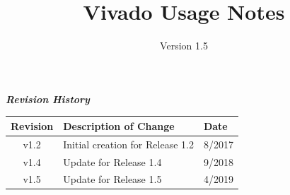 \def\docTitle{Vivado Usage Notes}
\def\docVersion{1.5}
\def\snippetpath{snippets}


\date{Version \docVersion} %
\title{\docTitle}
\lhead{\small{\docTitle}}
\usepackage{enumitem}

\maketitle
\thispagestyle{fancy}
\newpage
\begin{center}
  \textit{\textbf{Revision History}}
  \begin{table}[H]
    \begin{tabularx}{\textwidth}{|c|X|l|}
      \hline
      \rowcolor{blue}
      \textbf{Revision} & \textbf{Description of Change} & \textbf{Date} \\
      \hline
      v1.2 & Initial creation for Release 1.2 & 8/2017 \\
      \hline
      v1.4 & Update for Release 1.4 & 9/2018 \\
      \hline
      v1.5 & Update for Release 1.5 & 4/2019 \\
      \hline
    \end{tabularx}
  \end{table}

\end{center}
\newpage

